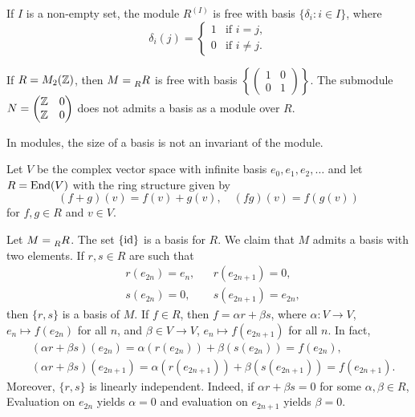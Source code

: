 \begin{example}
If $I$ is a non-empty set, the module $R^{(I)}$ is free with basis 
$\{\delta_i:i\in I\}$, where 
\[
\delta_i(j)=\begin{cases}
	1 & \text{if $i=j$},\\
	0 & \text{if $i\ne j$.}
	\end{cases}	
\]
\end{example}

\begin{example}
If $R=M_2(\mathbb{Z})$, then $M=\prescript{}{R}R$ is free with basis $\left\{\begin{pmatrix}
    1&0\\0&1\end{pmatrix}\right\}$. The submodule 
$N=\begin{pmatrix}\mathbb{Z}&0\\\mathbb{Z}&0\end{pmatrix}$ does not admits a basis as a module over $R$.
\end{example}

In modules, the size of a basis is not an invariant of the module.  

\begin{example}
Let $V$ be the complex vector space with infinite basis $e_0,e_1,e_2,\dots$ and let 
$R=\operatorname{End}(V)$ with the ring structure given by 
\[
(f+g)(v)=f(v)+g(v),\quad
(fg)(v)=f(g(v))
\]
for $f,g\in R$ and $v\in V$. 

Let $M=\prescript{}{R}R$. 
The set $\{\operatorname{id}\}$ is a basis for $R$.  
We claim that $M$ admits a basis with two elements. If
$r,s\in R$ are such that 
\begin{align*}
&r(e_{2n})=e_n, && r(e_{2n+1})=0,\\
&s(e_{2n})=0,&& s(e_{2n+1})=e_{2n},
\end{align*}
then $\{r,s\}$ is a basis of $M$. 
If $f\in R$, then
$f=\alpha r+\beta s$, where $\alpha\colon V\to V$, $e_n\mapsto f(e_{2n})$ for all $n$, and
$\beta\in V\to V$, $e_n\mapsto f(e_{2n+1})$ for all $n$. In fact,
\begin{align*}
&(\alpha r+\beta s)(e_{2n})=\alpha(r(e_{2n}))+\beta(s(e_{2n}))=f(e_{2n}),\\
&(\alpha r+\beta s)(e_{2n+1})=\alpha(r(e_{2n+1}))+\beta(s(e_{2n+1}))=f(e_{2n+1}).
\end{align*}
Moreover, $\{r,s\}$ is linearly independent. Indeed, if $\alpha r+\beta s=0$ for some $\alpha,\beta\in R$,  
Evaluation on $e_{2n}$ yields $\alpha=0$ and evaluation on $e_{2n+1}$ yields $\beta=0$.   
\end{example} 

